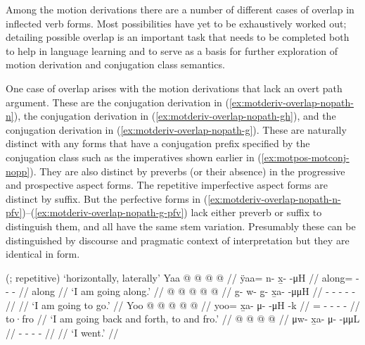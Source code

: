 \documentclass[12pt,letterpaper,oneside,article]{memoir}
\begin{document}
Among the motion derivations there are a number of different cases of overlap in inflected verb forms.
Most possibilities have yet to be exhaustively worked out; detailing possible overlap is an important task that needs to be completed both to help in language learning and to serve as a basis for further exploration of motion derivation and conjugation class semantics.

One case of overlap arises with the motion derivations that lack an overt path argument.
These are the  conjugation derivation in (\ref{ex:motderiv-overlap-nopath-n}), the  conjugation derivation in (\ref{ex:motderiv-overlap-nopath-gh}), and the  conjugation derivation in (\ref{ex:motderiv-overlap-nopath-g}).
These are naturally distinct with any forms that have a conjugation prefix specified by the conjugation class such as the imperatives shown earlier in (\ref{ex:motpos-motconj-nopp}).
They are also distinct by preverbs (or their absence) in the progressive and prospective aspect forms.
The repetitive imperfective aspect forms are distinct by suffix.
But the perfective forms in (\ref{ex:motderiv-overlap-nopath-n-pfv})–(\ref{ex:motderiv-overlap-nopath-g-pfv}) lack either preverb or suffix to distinguish them, and all have the same  stem variation.
Presumably these can be distinguished by discourse and pragmatic context of interpretation but they are identical in form.

\pex\label{ex:motderiv-overlap-nopath-n}%
\a\label{ex:motderiv-overlap-nopath-n-motderiv}%
%
	 (;  repetitive) ‘horizontally, laterally’
\a\label{ex:motderiv-overlap-nopath-n-prog}%
%
\begingl
	\gla	Yaa @  @ {} @ {} @ {} //
	\glb	ÿaa= n- x̱-  -μH //
	\glc	along= - -  - //
	\gld	along\•  {} {} {} //
	\glft	‘I am going along.’
		//
\endgl
\a\label{ex:motderiv-overlap-nopath-n-prosp}%
%
\begingl
	\gla	{} @ {} @ {} @ {} @ {} @ {} //
	\glb	g- w- g̱- x̱a-  -μμH //
	\glc	{}- - - -  - //
	\gld	{} {} {} {} {} {} //
	\glft	‘I am going to go.’
		//
\endgl
\a\label{ex:motderiv-overlap-nopath-n-repimpfv}%
%
\begingl
	\gla	Yoo @  @ {} @ {} @ {} @ {} //
	\glb	yoo= x̱a- μ-  -μH -k //
	\glc	{}= - -  - - //
	\gld	to·fro\•  {} {} {} {} //
	\glft	‘I am going back and forth, to and fro.’
		//
\endgl
\a\label{ex:motderiv-overlap-nopath-n-pfv}%
%
\begingl
	\gla	{} @ {} @ {} @ {} @ {} //
	\glb	μw- x̱a- μ-  -μμL //
	\glc	{}- - -  - //
	\gld	{} {} {} {} {} //
	\glft	‘I went.’
		//
\endgl
\xe
\end{document}
